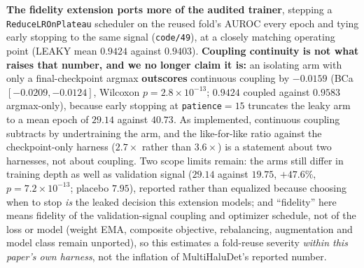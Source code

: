 \documentclass[10pt]{article} %
\begin{document}
\textbf{The fidelity extension ports more of the audited trainer}, stepping a
\texttt{ReduceLROnPlateau} scheduler on the reused fold's AUROC every epoch
and tying early stopping to the same signal (\texttt{code/49}), at a closely
matching operating point (LEAKY mean $0.9424$ against $0.9403$).
\textbf{Coupling continuity is not what raises that number, and we no longer
claim it is:} an isolating arm with only a final-checkpoint argmax
\textbf{outscores} continuous coupling by $-0.0159$ (BCa $[-0.0209,-0.0124]$,
Wilcoxon $p=2.8\times10^{-13}$; $0.9424$ coupled against $0.9583$
argmax-only), because early stopping at \texttt{patience}$=15$ truncates the
leaky arm to a mean epoch of $29.14$ against $40.73$. As implemented,
continuous coupling subtracts by undertraining the arm, and the like-for-like
ratio against the checkpoint-only harness ($2.7\times$ rather than
$3.6\times$) is a statement about two harnesses, not about coupling. Two
scope limits remain: the arms still differ in training depth as well as
validation signal ($29.14$ against $19.75$, $+47.6\%$, $p=7.2\times10^{-13}$;
placebo $7.95$), reported rather than equalized because choosing when to
stop \emph{is} the leaked decision this extension models; and ``fidelity''
here means fidelity of the validation-signal coupling and optimizer schedule,
not of the loss or model (weight EMA, composite objective, rebalancing,
augmentation and model class remain unported), so this estimates a
fold-reuse severity \emph{within this paper's own harness}, not the inflation
of MultiHaluDet's reported number.
\end{document}
